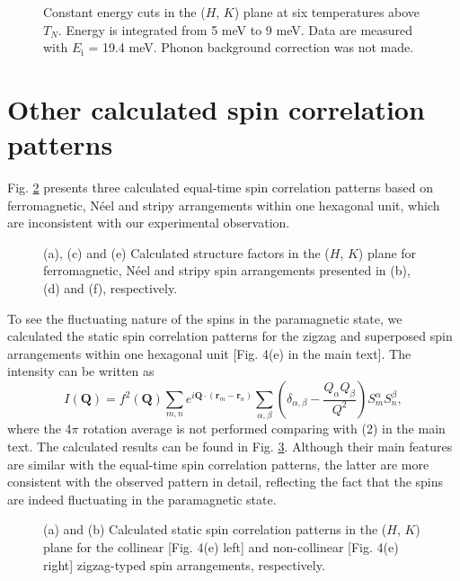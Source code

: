 \documentclass[%
reprint,
superscriptaddress,
amsmath,amssymb,
aps,
prb,
]{revtex4-2}
\begin{document}
	\begin{figure}[h]
		\caption{Constant energy cuts in the ($H$, $K$) plane at six temperatures above $T_N$. Energy is integrated from 5 meV to 9 meV. Data are measured with $E_\mathrm{i}$ = 19.4 meV. Phonon background correction was not made.}
	\label{figs6}
	\end{figure}	
	\section{Other calculated spin correlation patterns}

	Fig. \ref{figs7} presents three calculated equal-time spin correlation patterns based on ferromagnetic, N\'eel and stripy arrangements within one hexagonal unit, which are inconsistent with our experimental observation.
	
	\begin{figure}[h!]
		\caption{(a), (c) and (e) Calculated structure factors in the ($H$, $K$) plane for ferromagnetic, N\'eel and stripy spin arrangements presented in (b), (d) and (f), respectively.}
		\label{figs7}
	\end{figure}
	
	To see the fluctuating nature of the spins in the paramagnetic state, we calculated the static spin correlation patterns for the zigzag and superposed spin arrangements within one hexagonal unit [Fig. 4(e) in the main text]. The intensity can be written as
	\begin{equation}
		I(\textbf{Q}) = f^2(\textbf{Q}) \sum_{m,n}e^{i\textbf{Q}\cdot(\textbf{r}_m-\textbf{r}_n)}\sum_{\alpha,\beta}(\delta_{\alpha,\beta}-\frac{Q_{\alpha}Q_{\beta}}{Q^2}) S_m^{\alpha}S_n^{\beta},
	\end{equation}
	where the 4$\pi$ rotation average is not performed comparing with (2) in the main text. The calculated results can be found in Fig. \ref{figs8}. Although their main features are similar with the equal-time spin correlation patterns, the latter are more consistent with the observed pattern in detail, reflecting the fact that the spins are indeed fluctuating in the paramagnetic state.
	

	\begin{figure}[h!]
		\caption{(a) and (b) Calculated static spin correlation patterns in the ($H$, $K$) plane for the collinear [Fig. 4(e) left] and non-collinear [Fig. 4(e) right] zigzag-typed spin arrangements, respectively.}
		\label{figs8}
	\end{figure}


	
\end{document}
